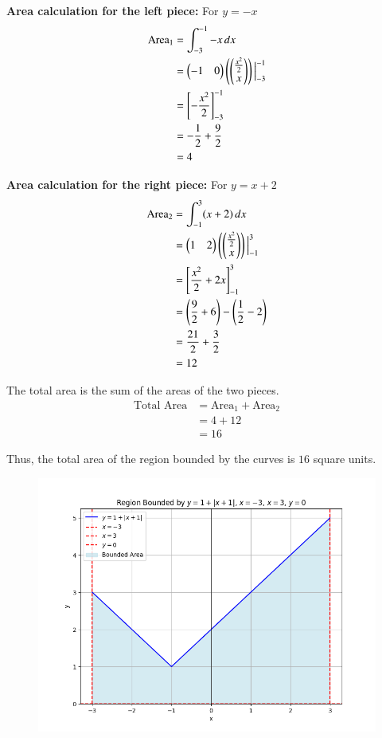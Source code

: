 \documentclass[journal]{IEEEtran}
\begin{document}
\textbf{Area calculation for the left piece:}
For $y=-x$ 
\begin{align}
    \text{Area}_1 &= \int_{-3}^{-1} -x \,dx \\
    &= \begin{pmatrix}-1 & 0\end{pmatrix} \left( \begin{pmatrix}\tfrac{x^2}{2} \\ x\end{pmatrix} \right) \Big|_{-3}^{-1} \\
    &= \left[ -\frac{x^2}{2} \right]_{-3}^{-1} \\
    &= -\frac{1}{2} + \frac{9}{2} \\
    &= 4
\end{align}

\textbf{Area calculation for the right piece:}
For $y=x+2$
\begin{align}
    \text{Area}_2 &= \int_{-1}^{3} (x+2) \,dx \\
    &= \begin{pmatrix}1 & 2\end{pmatrix} \left( \begin{pmatrix}\tfrac{x^2}{2} \\ x\end{pmatrix} \right) \Big|_{-1}^{3} \\
    &= \left[ \frac{x^2}{2} + 2x \right]_{-1}^{3} \\
    &= \left( \frac{9}{2} + 6 \right) - \left( \frac{1}{2} - 2 \right) \\
    &= \frac{21}{2} + \frac{3}{2} \\
    &= 12
\end{align}

The total area is the sum of the areas of the two pieces.
\begin{align}
    \text{Total Area} &= \text{Area}_1 + \text{Area}_2 \\
    &= 4 + 12 \\
    &= 16
\end{align}

Thus, the total area of the region bounded by the curves is $16$ square units.

\begin{figure}[H]
\centering
\includegraphics[width=0.7\columnwidth]{figs/fig2.png}
\caption{}
\label{fig:1}
\end{figure}
\end{document}
